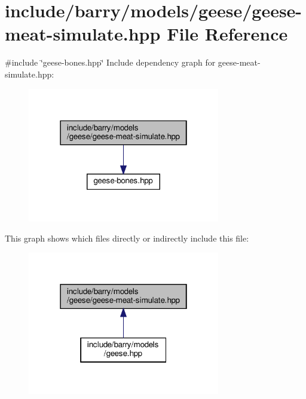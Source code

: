 \hypertarget{geese-meat-simulate_8hpp}{}\section{include/barry/models/geese/geese-\/meat-\/simulate.hpp File Reference}
\label{geese-meat-simulate_8hpp}
{\ttfamily \#include \char`\"{}geese-\/bones.\+hpp\char`\"{}}\newline
Include dependency graph for geese-\/meat-\/simulate.hpp\+:\nopagebreak
\begin{figure}[H]
\begin{center}
\leavevmode
\includegraphics[width=238pt]{geese-meat-simulate_8hpp__incl}
\end{center}
\end{figure}
This graph shows which files directly or indirectly include this file\+:\nopagebreak
\begin{figure}[H]
\begin{center}
\leavevmode
\includegraphics[width=238pt]{geese-meat-simulate_8hpp__dep__incl}
\end{center}
\end{figure}
